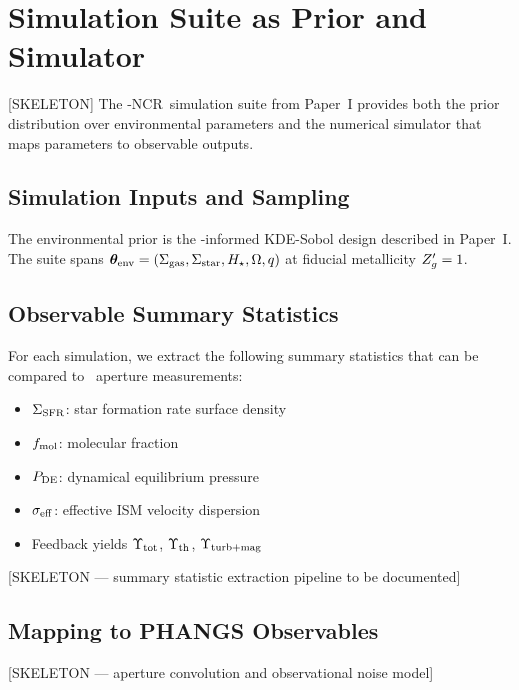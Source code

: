 \section{Simulation Suite as Prior and Simulator}
\label{sec:simulation_prior}

[SKELETON] The \TIGRESS-NCR\ simulation suite from Paper~I provides both the prior
distribution over environmental parameters and the numerical simulator that maps
parameters to observable outputs.

\subsection{Simulation Inputs and Sampling}

The environmental prior is the \PHANGS-informed KDE-Sobol design described in
Paper~I. The suite spans $\boldsymbol{\theta}_{\rm env} = (\Sigma_{\rm gas}, \Sigma_{\rm star}, H_\star, \Omega, q)$
at fiducial metallicity $Z_g' = 1$.

\subsection{Observable Summary Statistics}

For each simulation, we extract the following summary statistics that can be compared
to \PHANGS\ aperture measurements:
\begin{itemize}
  \item $\Sigma_{\rm SFR}$: star formation rate surface density
  \item $f_{\rm mol}$: molecular fraction
  \item $P_{\rm DE}$: dynamical equilibrium pressure
  \item $\sigma_{\rm eff}$: effective ISM velocity dispersion
  \item Feedback yields $\Upsilon_{\rm tot}$, $\Upsilon_{\rm th}$, $\Upsilon_{\rm turb+mag}$
\end{itemize}

[SKELETON --- summary statistic extraction pipeline to be documented]

\subsection{Mapping to PHANGS Observables}

[SKELETON --- aperture convolution and observational noise model]
